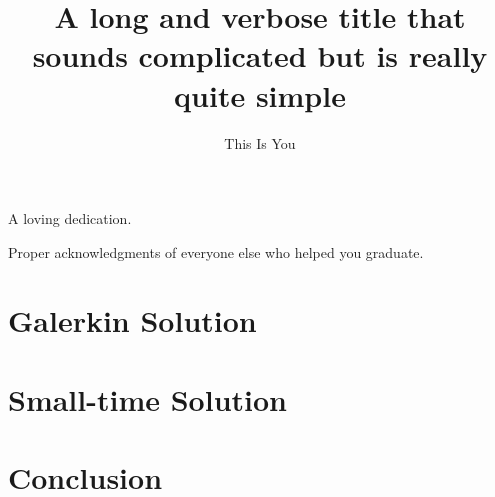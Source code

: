 



\title{A long and verbose title that sounds complicated but is really quite simple}
\author{This Is You}
\deanlinethree{}

\begin{frontmatter}
\maketitle

\copyrightpage

\tableofcontents

\listoffigures

\listoftables

\begin{abstract}

\end{abstract}

\begin{dedication}
\vspace*{\fill}
\begin{center}
A loving dedication.
\end{center}
\vspace*{\fill}
\end{dedication}

\begin{acknowledgements}
Proper acknowledgments of everyone else who helped you graduate.
\end{acknowledgements}

\end{frontmatter}

\chapter{Galerkin Solution}


\chapter{Small-time Solution}


\chapter{Conclusion}



\nocite{*}

\singlespacing

\doublespacing

